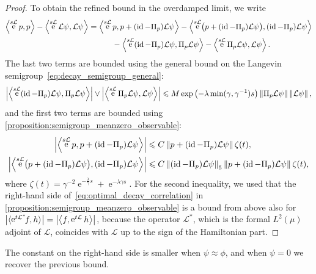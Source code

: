 \documentclass[11pt,a4paper]{article}
\DeclareMathOperator{\e}{e}
\DeclareMathOperator{\id}{id}
\theoremstyle{plain}
\numberwithin{equation}{section}
\renewcommand{\leq}{\leqslant}
\begin{document}
\begin{proof}
To obtain the refined bound in the overdamped limit,
we write
\begin{align*}
    \ip{\e^{s \mathcal L}p}{p} - \ip{\e^{s \mathcal L} \mathcal L \psi}{\mathcal L \psi}
      &= \ip{\e^{s \mathcal L} p}{p + (\id - \Pi_p) \mathcal L \psi}
    - \ip{\e^{s \mathcal L} \bigl(p + (\id - \Pi_p) \mathcal L \psi\bigr)}{(\id - \Pi_p) \mathcal L \psi} \\
    &\qquad \quad - \ip{\e^{s \mathcal L} (\id - \Pi_p) \mathcal L \psi}{\Pi_p \mathcal L \psi}
    - \ip{\e^{s \mathcal L} \Pi_p \mathcal L \psi}{\mathcal L \psi}.
\end{align*}
The last two terms are bounded using the general bound on the Langevin semigroup~\eqref{eq:decay_semigroup_general}:
\[
    \abs{\ip{\e^{s \mathcal L} (\id - \Pi_p) \mathcal L \psi}{\Pi_p \mathcal L \psi}}
    \vee \abs{\ip{\e^{s \mathcal L} \Pi_p \mathcal L \psi}{\mathcal L \psi}}
    \leq M \exp \left( - \lambda \min(\gamma, \gamma^{-1}) s\right) \norm{\Pi_p \mathcal L \psi} \norm{\mathcal L \psi},
\]
and the first two terms are bounded using \cref{proposition:semigroup_meanzero_observable}:
\begin{align*}
    \abs{\ip{\e^{s \mathcal L} p}{p + (\id - \Pi_p) \mathcal L \psi}}
    &\leq C \norm{p + (\id - \Pi_p) \mathcal L \psi} \zeta(t), \\
    \abs{\ip{\e^{s \mathcal L} \bigl(p + (\id - \Pi_p) \mathcal L \psi\bigr)}{(\id - \Pi_p) \mathcal L \psi}}
    &\leq C \norm{(\id - \Pi_p) \mathcal L \psi}[5] \norm{p + (\id - \Pi_p) \mathcal L \psi} \zeta(t),
\end{align*}
where $\zeta(t) = \gamma^{-2} \e^{- \frac{\lambda}{\gamma}s } + \e^{- \lambda \gamma s}$.
For the second inequality,
we used that the right-hand side of~\eqref{eq:optimal_decay_correlation} in \cref{proposition:semigroup_meanzero_observable} is a bound from above also for $\abs{\ip*{\e^{t \mathcal L^*}\!\! f}{h}} = \abs{\ip{f}{\e^{t \mathcal L}h}}$,
because the operator $\mathcal L^*$,
which is the formal $L^2(\mu)$ adjoint of $\mathcal L$,
coincides with $\mathcal L$ up to the sign of the Hamiltonian part.
\end{proof}

The constant on the right-hand side is smaller when $\psi \approx \phi$,
and when $\psi = 0$ we recover the previous bound.
\end{document}
